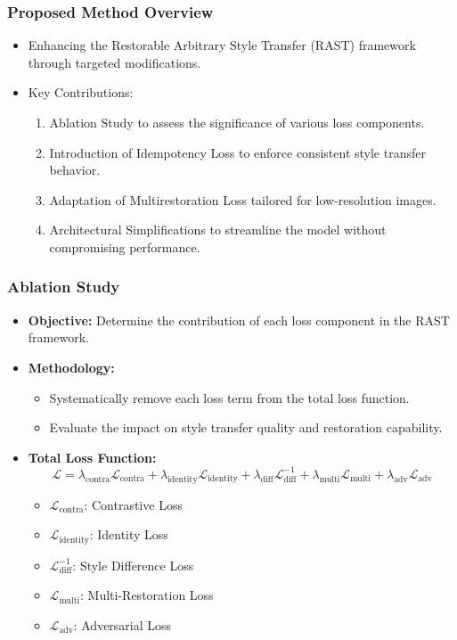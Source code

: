 
\begin{frame}
\frametitle{Proposed Method Overview}

\begin{itemize}
    \item Enhancing the Restorable Arbitrary Style Transfer (RAST) framework through targeted modifications.
    \item Key Contributions:
    \begin{enumerate}
        \item Ablation Study to assess the significance of various loss components.
        \item Introduction of Idempotency Loss to enforce consistent style transfer behavior.
        \item Adaptation of Multirestoration Loss tailored for low-resolution images.
        \item Architectural Simplifications to streamline the model without compromising performance.
    \end{enumerate}
\end{itemize}

\end{frame}

\begin{frame}
\frametitle{Ablation Study}

\begin{itemize}
    \item \textbf{Objective:} Determine the contribution of each loss component in the RAST framework.
    \item \textbf{Methodology:}
    \begin{itemize}
        \item Systematically remove each loss term from the total loss function.
        \item Evaluate the impact on style transfer quality and restoration capability.
    \end{itemize}
    \item \textbf{Total Loss Function:}
    \[
    \mathcal{L} = \lambda_{\text{contra}} \mathcal{L}_{\text{contra}} + \lambda_{\text{identity}} \mathcal{L}_{\text{identity}} + \lambda_{\text{diff}} \mathcal{L}^{-1}_{\text{diff}} + \lambda_{\text{multi}} \mathcal{L}_{\text{multi}} + \lambda_{\text{adv}} \mathcal{L}_{\text{adv}}
    \]
    \begin{itemize}
        \item \(\mathcal{L}_{\text{contra}}\): Contrastive Loss
        \item \(\mathcal{L}_{\text{identity}}\): Identity Loss
        \item \(\mathcal{L}^{-1}_{\text{diff}}\): Style Difference Loss
        \item \(\mathcal{L}_{\text{multi}}\): Multi-Restoration Loss
        \item \(\mathcal{L}_{\text{adv}}\): Adversarial Loss
    \end{itemize}
\end{itemize}

\end{frame}

